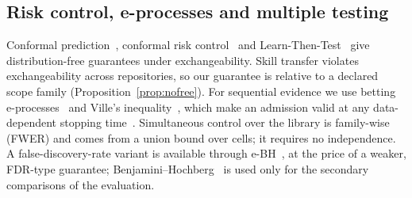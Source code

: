 \subsection{Risk control, e-processes and multiple testing}
Conformal prediction~\cite{vovk2005alrw}, conformal risk control~\cite{angelopoulos2024crc} and Learn-Then-Test~\cite{angelopoulos2021ltt}
give distribution-free guarantees under exchangeability.  Skill transfer violates exchangeability across repositories, so our
guarantee is relative to a declared scope family (Proposition~\ref{prop:nofree}).
For sequential evidence we use betting e-processes~\cite{waudbysmith2024betting} and Ville's inequality~\cite{ville1939}, which make
an admission valid at any data-dependent stopping time~\cite{howard2021timeuniform,ramdas2023gametheoretic}.
Simultaneous control over the library is family-wise (FWER) and comes from a union bound over cells; it requires no independence.
A false-discovery-rate variant is available through e-BH~\cite{wang2022ebh}, at the price of a weaker, FDR-type guarantee;
Benjamini--Hochberg~\cite{benjamini1995fdr} is used only for the secondary comparisons of the evaluation.
